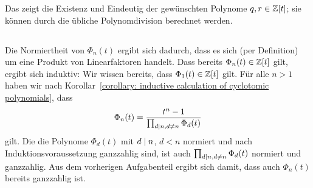 Das zeigt die Existenz und Eindeutig der gewünschten Polynome $q, r \in \mathbb{Z}[t]$;
sie können durch die übliche Polynomdivision berechnet werden.





\subsection{}

Die Normiertheit von $\Phi_n(t)$ ergibt sich dadurch, dass es sich (per Definition) um eine Produkt von Linearfaktoren handelt.
Dass bereits $\Phi_n(t) \in \mathbb{Z}[t]$ gilt, ergibt sich induktiv:
Wir wissen bereits, dass $\Phi_1(t) \in \mathbb{Z}[t]$ gilt.
Für alle $n > 1$ haben wir nach Korollar~\ref{corollary: inductive calculation of cyclotomic polynomials}, dass
\[
    \Phi_n(t)
  = \frac{t^n - 1}{\prod_{d \mathrel{|} n, d \neq n} \Phi_d(t)}
\]
gilt.
Die die Polynome $\Phi_d(t)$ mit $d \mathrel{|} n$, $d < n$ normiert und nach Induktionsvoraussetzung ganzzahlig sind, ist auch $\prod_{d \mathrel{|} n, d \neq n} \Phi_d(t)$ normiert und ganzzahlig.
Aus dem vorherigen Aufgabenteil ergibt sich damit, dass auch $\Phi_n(t)$ bereits ganzzahlig ist.

































